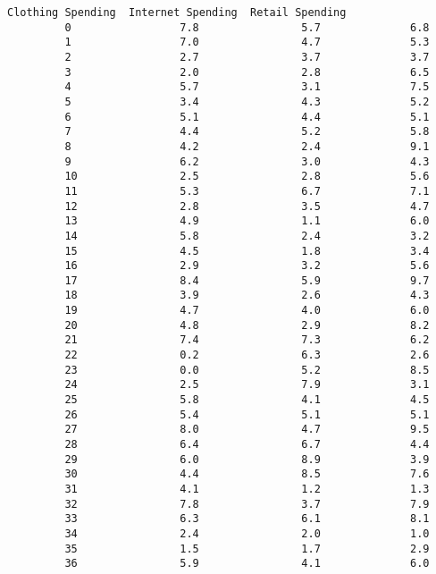 \documentclass[11pt]{article}
\begin{document}
\begin{Verbatim}[commandchars=\\\{\}]
             Clothing Spending  Internet Spending  Retail Spending  
         0                 7.8                5.7              6.8  
         1                 7.0                4.7              5.3  
         2                 2.7                3.7              3.7  
         3                 2.0                2.8              6.5  
         4                 5.7                3.1              7.5  
         5                 3.4                4.3              5.2  
         6                 5.1                4.4              5.1  
         7                 4.4                5.2              5.8  
         8                 4.2                2.4              9.1  
         9                 6.2                3.0              4.3  
         10                2.5                2.8              5.6  
         11                5.3                6.7              7.1  
         12                2.8                3.5              4.7  
         13                4.9                1.1              6.0  
         14                5.8                2.4              3.2  
         15                4.5                1.8              3.4  
         16                2.9                3.2              5.6  
         17                8.4                5.9              9.7  
         18                3.9                2.6              4.3  
         19                4.7                4.0              6.0  
         20                4.8                2.9              8.2  
         21                7.4                7.3              6.2  
         22                0.2                6.3              2.6  
         23                0.0                5.2              8.5  
         24                2.5                7.9              3.1  
         25                5.8                4.1              4.5  
         26                5.4                5.1              5.1  
         27                8.0                4.7              9.5  
         28                6.4                6.7              4.4  
         29                6.0                8.9              3.9  
         30                4.4                8.5              7.6  
         31                4.1                1.2              1.3  
         32                7.8                3.7              7.9  
         33                6.3                6.1              8.1  
         34                2.4                2.0              1.0  
         35                1.5                1.7              2.9  
         36                5.9                4.1              6.0  

\end{Verbatim}
\end{document}

